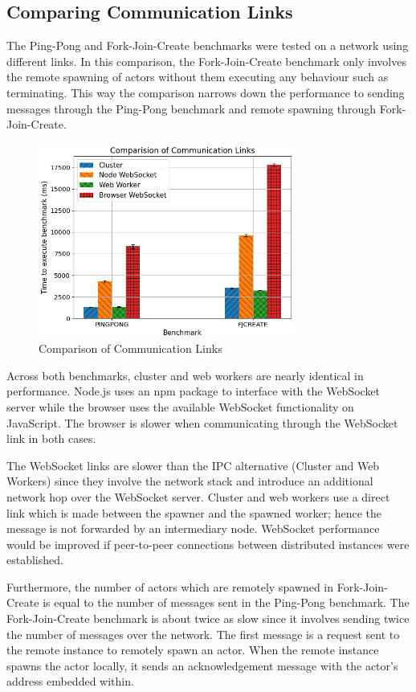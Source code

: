\documentclass[oneside]{um-fict}
\begin{document}
\subsection{Comparing Communication Links}
The Ping-Pong and Fork-Join-Create benchmarks were tested on a network using different links. In this comparison, the Fork-Join-Create benchmark only involves the remote spawning of actors without them executing any behaviour such as terminating. This way the comparison narrows down the performance to sending messages through the Ping-Pong benchmark and remote spawning through Fork-Join-Create.
\begin{figure}[H]
    \begin{centering}
        \includegraphics[width=320px]{resources/link.png}
        \caption{Comparison of Communication Links}\label{fig:link}
    \end{centering}
\end{figure}
Across both benchmarks, cluster and web workers are nearly identical in performance. Node.js uses an npm package to interface with the WebSocket server while the browser uses the available WebSocket functionality on JavaScript. The browser is slower when communicating through the WebSocket link in both cases. 

The WebSocket links are slower than the IPC alternative (Cluster and Web Workers) since they involve the network stack and introduce an additional network hop over the WebSocket server. Cluster and web workers use a direct link which is made between the spawner and the spawned worker; hence the message is not forwarded by an intermediary node. WebSocket performance would be improved if peer-to-peer connections between distributed instances were established.

Furthermore, the number of actors which are remotely spawned in Fork-Join-Create is equal to the number of messages sent in the Ping-Pong benchmark. The Fork-Join-Create benchmark is about twice as slow since it involves sending twice the number of messages over the network. The first message is a request sent to the remote instance to remotely spawn an actor. When the remote instance spawns the actor locally, it sends an acknowledgement message with the actor's address embedded within.
\end{document}
